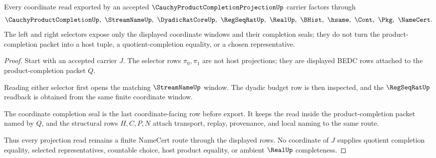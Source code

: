 \begin{theorem}
\label{thm:cauchy-product-completion-projection-route}
Every coordinate read exported by an accepted $\CauchyProductCompletionProjectionUp$ carrier factors through
$$
\CauchyProductCompletionUp,\ \StreamNameUp,\ \DyadicRatCoreUp,\ \RegSeqRatUp,\ \RealUp,\ \BHist,\ \hsame,\ \Cont,\ \Pkg,\ \NameCert .
$$
The left and right selectors expose only the displayed coordinate windows and their completion seals; they do not turn the product-completion packet into a host tuple, a quotient-completion equality, or a chosen representative.
\end{theorem}
\begin{proof}
Start with an accepted carrier $J$. The selector rows $\pi_0,\pi_1$ are not host projections; they are displayed BEDC rows attached to the product-completion packet $Q$.

Reading either selector first opens the matching $\StreamNameUp$ window. The dyadic budget row is then inspected, and the $\RegSeqRatUp$ readback is obtained from the same finite coordinate window.

The coordinate completion seal is the last coordinate-facing row before export. It keeps the read inside the product-completion packet named by $Q$, and the structural rows $H,C,P,N$ attach transport, replay, provenance, and local naming to the same route.

Thus every projection read remains a finite NameCert route through the displayed rows. No coordinate of $J$ supplies quotient completion equality, selected representatives, countable choice, host product equality, or ambient $\RealUp$ completeness.
\end{proof}

\begin{closurestatus}{\CauchyProductCompletionProjectionUp}
  \theoryclosure{\seedClosure}
  \formalstatus{\unformalizedV}
\end{closurestatus}
